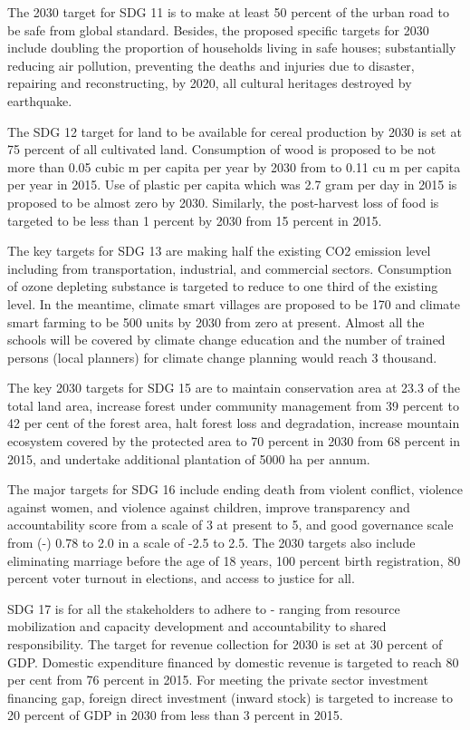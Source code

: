 \documentclass[
  openany]{book}
\begin{document}
The 2030 target for SDG 11 is to make at least 50 percent of the urban road to be safe from global standard. Besides, the proposed specific targets for 2030 include doubling the proportion of households living in safe houses; substantially reducing air pollution, preventing the deaths and injuries due to disaster, repairing and reconstructing, by 2020, all cultural heritages destroyed by earthquake.

The SDG 12 target for land to be available for cereal production by 2030 is set at 75 percent of all cultivated land. Consumption of wood is proposed to be not more than 0.05 cubic m per capita per year by 2030 from to 0.11 cu m per capita per year in 2015. Use of plastic per capita which was 2.7 gram per day in 2015 is proposed to be almost zero by 2030. Similarly, the post-harvest loss of food is targeted to be less than 1 percent by 2030 from 15 percent in 2015.

The key targets for SDG 13 are making half the existing CO2 emission level including from transportation, industrial, and commercial sectors. Consumption of ozone depleting substance is targeted to reduce to one third of the existing level. In the meantime, climate smart villages are proposed to be 170 and climate smart farming to be 500 units by 2030 from zero at present. Almost all the schools will be covered by climate change education and the number of trained persons (local planners) for climate change planning would reach 3 thousand.

The key 2030 targets for SDG 15 are to maintain conservation area at 23.3 of the total land area, increase forest under community management from 39 percent to 42 per cent of the forest area, halt forest loss and degradation, increase mountain ecosystem covered by the protected area to 70 percent in 2030 from 68 percent in 2015, and undertake additional plantation of 5000 ha per annum.

The major targets for SDG 16 include ending death from violent conflict, violence against women, and violence against children, improve transparency and accountability score from a scale of 3 at present to 5, and good governance scale from (-) 0.78 to 2.0 in a scale of -2.5 to 2.5. The 2030 targets also include eliminating marriage before the age of 18 years, 100 percent birth registration, 80 percent voter turnout in elections, and access to justice for all.

SDG 17 is for all the stakeholders to adhere to - ranging from resource mobilization and capacity development and accountability to shared responsibility. The target for revenue collection for 2030 is set at 30 percent of GDP. Domestic expenditure financed by domestic revenue is targeted to reach 80 per cent from 76 percent in 2015. For meeting the private sector investment financing gap, foreign direct investment (inward stock) is targeted to increase to 20 percent of GDP in 2030 from less than 3 percent in 2015.
\end{document}
